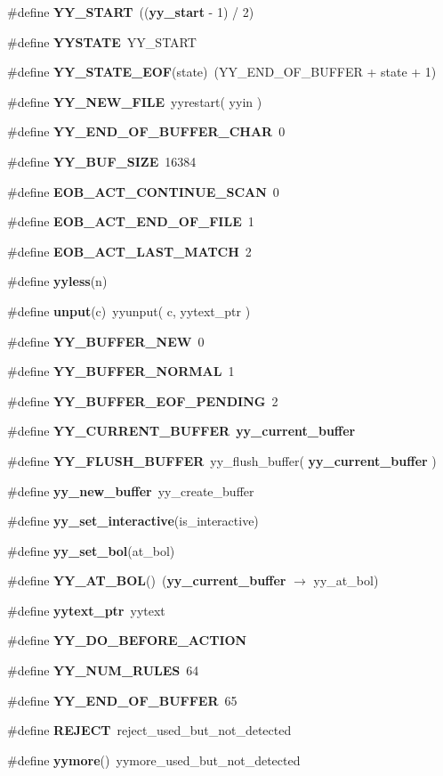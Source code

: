 \begin{CompactItemize}
\item 
\#define {\bf YY\_\-START}\ (({\bf yy\_\-start} - 1) / 2)
\item 
\#define {\bf YYSTATE}\ YY\_\-START
\item 
\#define {\bf YY\_\-STATE\_\-EOF}(state)\ (YY\_\-END\_\-OF\_\-BUFFER + state + 1)
\item 
\#define {\bf YY\_\-NEW\_\-FILE}\ yyrestart( yyin )
\item 
\#define {\bf YY\_\-END\_\-OF\_\-BUFFER\_\-CHAR}\ 0
\item 
\#define {\bf YY\_\-BUF\_\-SIZE}\ 16384
\item 
\#define {\bf EOB\_\-ACT\_\-CONTINUE\_\-SCAN}\ 0
\item 
\#define {\bf EOB\_\-ACT\_\-END\_\-OF\_\-FILE}\ 1
\item 
\#define {\bf EOB\_\-ACT\_\-LAST\_\-MATCH}\ 2
\item 
\#define {\bf yyless}(n)
\item 
\#define {\bf unput}(c)\ yyunput( c, yytext\_\-ptr )
\item 
\#define {\bf YY\_\-BUFFER\_\-NEW}\ 0
\item 
\#define {\bf YY\_\-BUFFER\_\-NORMAL}\ 1
\item 
\#define {\bf YY\_\-BUFFER\_\-EOF\_\-PENDING}\ 2
\item 
\#define {\bf YY\_\-CURRENT\_\-BUFFER}\ {\bf yy\_\-current\_\-buffer}
\item 
\#define {\bf YY\_\-FLUSH\_\-BUFFER}\ yy\_\-flush\_\-buffer( {\bf yy\_\-current\_\-buffer} )
\item 
\#define {\bf yy\_\-new\_\-buffer}\ yy\_\-create\_\-buffer
\item 
\#define {\bf yy\_\-set\_\-interactive}(is\_\-interactive)
\item 
\#define {\bf yy\_\-set\_\-bol}(at\_\-bol)
\item 
\#define {\bf YY\_\-AT\_\-BOL}()\ ({\bf yy\_\-current\_\-buffer} $\rightarrow$ yy\_\-at\_\-bol)
\item 
\#define {\bf yytext\_\-ptr}\ yytext
\item 
\#define {\bf YY\_\-DO\_\-BEFORE\_\-ACTION}
\item 
\#define {\bf YY\_\-NUM\_\-RULES}\ 64
\item 
\#define {\bf YY\_\-END\_\-OF\_\-BUFFER}\ 65
\item 
\#define {\bf REJECT}\ reject\_\-used\_\-but\_\-not\_\-detected
\item 
\#define {\bf yymore}()\ yymore\_\-used\_\-but\_\-not\_\-detected

\end{CompactItemize}
